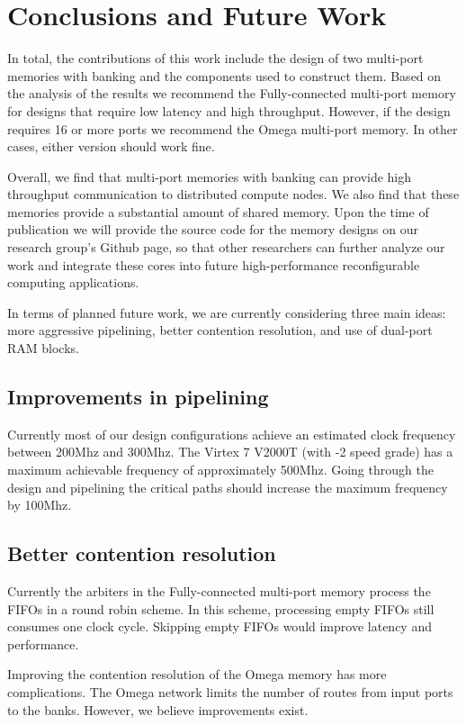 \section{Conclusions and Future Work}
\label{sec:conclusion}


In total, the contributions of this work include the design of two multi-port memories with banking and the components used to construct them. Based on the analysis of the results we recommend the Fully-connected multi-port memory for designs that require low latency and high throughput. However, if the design requires 16 or more ports we recommend the Omega multi-port memory. In other cases, either version should work fine. 

Overall, we find that multi-port memories with banking can provide high throughput communication to distributed compute nodes. We also find that these memories provide a substantial amount of shared memory. Upon the time of publication we will provide the source code for the memory designs on our research group's Github page, so that other researchers can further analyze our work and integrate these cores into future high-performance reconfigurable computing applications. 

In terms of planned future work, we are currently considering three main ideas: more aggressive pipelining, better contention resolution, and use of dual-port RAM blocks.

\subsection{Improvements in pipelining }
Currently most of our design configurations achieve an estimated clock frequency between 200Mhz and 300Mhz. The Virtex 7 V2000T (with -2 speed grade) has a maximum achievable frequency of approximately 500Mhz. Going through the design and pipelining the critical paths should increase the maximum frequency by 100Mhz.

\subsection{Better contention resolution}
\label{sec:futurecontrol}
Currently the arbiters in the Fully-connected multi-port memory process the FIFOs in a round robin scheme. In this scheme, processing empty FIFOs still consumes one clock cycle. Skipping empty FIFOs would improve latency and performance.

Improving the contention resolution of the Omega memory has more complications. The Omega network limits the number of routes from input ports to the banks. However, we believe improvements exist.
